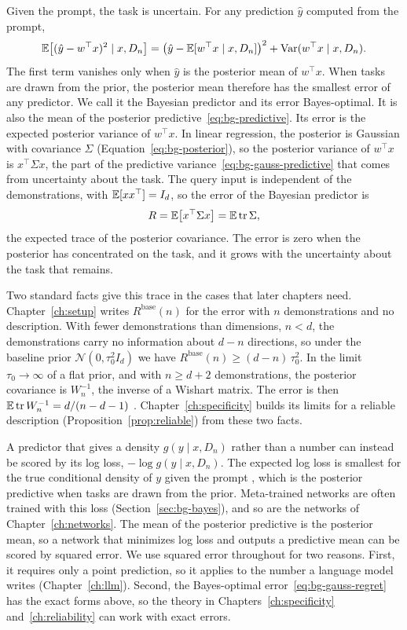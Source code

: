 Given the prompt, the task is uncertain. For any prediction $\hat y$ computed from the prompt,
\[
    \mathbb{E}\big[(\hat y - w^\top x)^2 \mid x, D_n\big] = \big(\hat y - \mathbb{E}[w^\top x \mid x, D_n]\big)^2 + \operatorname{Var}(w^\top x \mid x, D_n).
\]
The first term vanishes only when $\hat y$ is the posterior mean of $w^\top x$. When tasks are drawn from the prior, the posterior mean therefore has the smallest error of any predictor. We call it the Bayesian predictor and its error Bayes-optimal. It is also the mean of the posterior predictive~\eqref{eq:bg-predictive}. Its error is the expected posterior variance of $w^\top x$. In linear regression, the posterior is Gaussian with covariance $\Sigma$ (Equation~\eqref{eq:bg-posterior}), so the posterior variance of $w^\top x$ is $x^\top \Sigma x$, the part of the predictive variance~\eqref{eq:bg-gauss-predictive} that comes from uncertainty about the task. The query input is independent of the demonstrations, with $\mathbb{E}[x x^\top] = I_d$, so the error of the Bayesian predictor is
\begin{equation}\label{eq:bg-gauss-regret}
    R = \mathbb{E}\big[x^\top \Sigma x\big] = \mathbb{E} \operatorname{tr} \Sigma ,
\end{equation}
the expected trace of the posterior covariance. The error is zero when the posterior has concentrated on the task, and it grows with the uncertainty about the task that remains.

Two standard facts give this trace in the cases that later chapters need. Chapter~\ref{ch:setup} writes $R^{\mathrm{base}}(n)$ for the error with $n$ demonstrations and no description. With fewer demonstrations than dimensions, $n < d$, the demonstrations carry no information about $d - n$ directions, so under the baseline prior $\mathcal{N}(0, \tau_0^2 I_d)$ we have $R^{\mathrm{base}}(n) \ge (d - n)\,\tau_0^2$. In the limit $\tau_0 \to \infty$ of a flat prior, and with $n \ge d + 2$ demonstrations, the posterior covariance is $W_n^{-1}$, the inverse of a Wishart matrix. The error is then $\mathbb{E} \operatorname{tr} W_n^{-1} = d/(n - d - 1)$ \citep{muirhead1982}. Chapter~\ref{ch:specificity} builds its limits for a reliable description (Proposition~\ref{prop:reliable}) from these two facts.

A predictor that gives a density $g(y \mid x, D_n)$ rather than a number can instead be scored by its log loss, $-\log g(y \mid x, D_n)$. The expected log loss is smallest for the true conditional density of $y$ given the prompt \citep{cover2006}, which is the posterior predictive when tasks are drawn from the prior. Meta-trained networks are often trained with this loss (Section~\ref{sec:bg-bayes}), and so are the networks of Chapter~\ref{ch:networks}. The mean of the posterior predictive is the posterior mean, so a network that minimizes log loss and outputs a predictive mean can be scored by squared error. We use squared error throughout for two reasons. First, it requires only a point prediction, so it applies to the number a language model writes (Chapter~\ref{ch:llm}). Second, the Bayes-optimal error~\eqref{eq:bg-gauss-regret} has the exact forms above, so the theory in Chapters~\ref{ch:specificity} and~\ref{ch:reliability} can work with exact errors.


